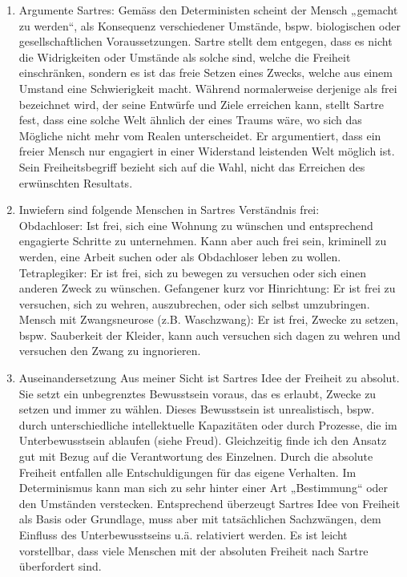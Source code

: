 \documentclass[12pt, letterpaper, twoside]{article}
\begin{document}
\begin{flushleft}
\begin{enumerate}[label=\textbf{\alph*)}]
	\item
	Argumente Sartres: Gemäss den Deterministen scheint der Mensch „gemacht zu werden“,
	als Konsequenz verschiedener Umstände, bspw. biologischen oder gesellschaftlichen Voraussetzungen.
	Sartre stellt dem entgegen, dass es nicht die Widrigkeiten oder Umstände als solche sind,
	welche die Freiheit einschränken, sondern es ist das freie Setzen eines Zwecks,
	welche aus einem Umstand eine Schwierigkeit macht.
	Während normalerweise derjenige als frei bezeichnet wird, der seine Entwürfe und Ziele erreichen
	kann, stellt Sartre fest, dass eine solche Welt ähnlich der eines Traums wäre, wo sich das Mögliche
	nicht mehr vom Realen unterscheidet. Er argumentiert, dass ein freier Mensch nur
	engagiert in einer Widerstand leistenden Welt möglich ist. Sein Freiheitsbegriff bezieht sich auf die
	Wahl, nicht das Erreichen des erwünschten Resultats.


	\item
	Inwiefern sind folgende Menschen in Sartres Verständnis frei:\\
	Obdachloser: Ist frei, sich eine Wohnung zu wünschen und entsprechend engagierte Schritte zu
	unternehmen. Kann aber auch frei sein, kriminell zu werden,
	eine Arbeit suchen oder als Obdachloser leben zu wollen.\\
	Tetraplegiker: Er ist frei, sich zu bewegen zu versuchen oder sich einen anderen Zweck zu wünschen.
	Gefangener kurz vor Hinrichtung: Er ist frei zu versuchen, sich zu wehren, auszubrechen,
	oder sich selbst umzubringen.
	Mensch mit Zwangsneurose (z.B. Waschzwang): Er ist frei, Zwecke zu setzen, bspw. Sauberkeit der Kleider,
	kann auch versuchen sich dagen zu wehren und versuchen den Zwang zu ingnorieren.


	\item
	Auseinandersetzung
	Aus meiner Sicht ist Sartres Idee der Freiheit zu absolut. Sie setzt ein unbegrenztes Bewusstsein
	voraus,	das es erlaubt, Zwecke zu setzen und immer zu wählen.
	Dieses Bewusstsein ist unrealistisch,
	bspw. durch unterschiedliche intellektuelle Kapazitäten oder durch Prozesse, die im Unterbewusstsein
	ablaufen (siehe Freud). Gleichzeitig finde ich den Ansatz gut mit Bezug auf die Verantwortung des Einzelnen.
	Durch die absolute Freiheit entfallen alle Entschuldigungen für das eigene Verhalten.
	Im Determinismus kann man sich zu sehr hinter einer Art „Bestimmung“ oder den Umständen verstecken.
	Entsprechend überzeugt Sartres Idee von Freiheit als Basis oder Grundlage, muss aber mit tatsächlichen
	Sachzwängen, dem Einfluss des Unterbewusstseins u.ä. relativiert werden. Es ist leicht vorstellbar,
	dass viele Menschen mit der absoluten Freiheit nach Sartre überfordert sind.

\end{enumerate}

\end{flushleft}
\end{document}
